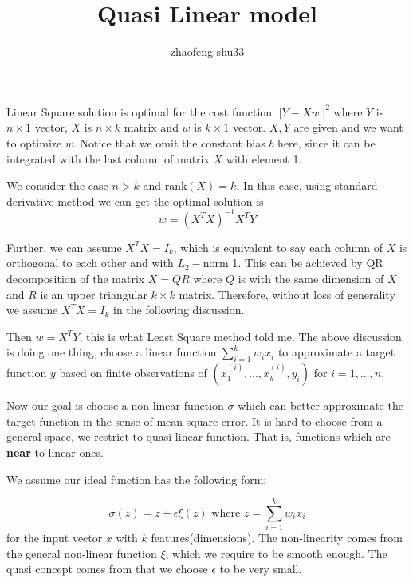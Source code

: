 \documentclass{article}
\title{Quasi Linear model}
\author{zhaofeng-shu33}
\begin{document}
	\maketitle
Linear Square solution is optimal for the cost function $||Y-Xw||^2$ where $Y$ is $n\times 1$ vector,
$X$ is $n\times k$ matrix and $w$ is $k\times 1$ vector. $X,Y$ are given and we want to optimize $w$.
Notice that we omit the constant bias $b$ here, since it can be integrated with the last column of matrix $X$ with element 1.

We consider the case $n > k$ and $\textrm{rank}(X) = k$. In this case, using standard derivative method we can get
the optimal solution is
$$
w = (X^TX)^{-1} X^T Y
$$

Further, we can assume $X^TX=I_k$, which is equivalent to say each column of $X$ is orthogonal to each other and with $L_2-$norm 1.
This can be achieved by QR decomposition of the matrix $X=QR$ where $Q$ is with the same dimension of $X$ and $R$ is an upper triangular 
$k\times k$ matrix. Therefore, without loss of generality we assume $X^TX=I_k$ in the following discussion.

Then $w=X^T Y$, this is what Least Square method told me. The above discussion is doing one thing, choose a linear function $\sum_{i=1}^k w_i x_i$
to approximate a target function $y$ based on finite observations of $(x^{(i)}_1,\dots, x^{(i)}_k, y_i)$ for $i=1,\dots, n$.

Now our goal is choose a non-linear function $\sigma$ which can better approximate the target function in the sense of mean square error.
It is hard to choose from a general space, we restrict to quasi-linear function. That is, functions which are \textbf{near} to 
linear ones.

We assume our ideal function has the following form:

$$
\sigma(z) = z + \epsilon \xi(z) \textrm{ where } z = \sum_{i=1}^k w_i x_i
$$
for the input vector $x$ with $k$ features(dimensions).
The non-linearity comes from the general non-linear function $\xi$, which we require to be smooth enough.
The quasi concept comes from that we choose $\epsilon$ to be very small.
\end{document}
